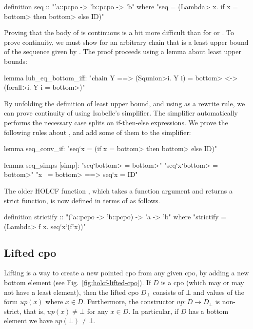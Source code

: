 %
\begin{isacode}
definition seq :: "'a::pcpo -> 'b::pcpo -> 'b"
  where "seq = (\<Lambda> x. if x = \<bottom> then \<bottom> else ID)"
\end{isacode}
%
Proving that the body of  is continuous is a bit more difficult than for  or . To prove continuity, we must show for an arbitrary chain  that  is a least upper bound of the sequence given by . The proof proceeds using a lemma about least upper bounds:
%
\begin{isacode}
lemma lub_eq_bottom_iff: "chain Y ==> (\<Squnion>i. Y i) = \<bottom> <-> (\<forall>i. Y i = \<bottom>)"
\end{isacode}
%
By unfolding the definition of least upper bound, and using  as a rewrite rule, we can prove continuity of  using Isabelle's simplifier. The simplifier automatically performs the necessary case splits on if-then-else expressions. We prove the following rules about , and add some of them to the simplifier:
%
\begin{isacode}
lemma seq_conv_if: "seq`x = (if x = \<bottom> then \<bottom> else ID)"
\end{isacode}
\unmedskip
{}
\begin{isacode}
lemma seq_simps [simp]:
  "seq`\<bottom> = \<bottom>"
  "seq`x`\<bottom> = \<bottom>"
  "x ~= \<bottom> ==> seq`x = ID"
\end{isacode}
%
The older HOLCF function , which takes a function argument and returns a strict function, is now defined in terms of  as follows.
%
\begin{isacode}
definition strictify :: "('a::pcpo -> 'b::pcpo) -> 'a -> 'b"
  where "strictify = (\<Lambda> f x. seq`x`(f`x))"
\end{isacode}
\unmedskip


\subsection{Lifted cpo}
\label{sec:holcf-u}

Lifting is a way to create a new pointed cpo from any given cpo, by adding a new bottom element (see Fig.~\ref{fig:holcf-lifted-cpo}). If $D$ is a cpo (which may or may not have a least element), then the lifted cpo $D_\bot$ consists of $\bot$ and values of the form $\mathit{up}(x)$ where $x\in D$. Furthermore, the constructor $\mathit{up} : D \to D_\bot$ is non-strict, that is, $\mathit{up}(x) \neq \bot$ for any $x \in D$. In particular, if $D$ has a bottom element we have $\mathit{up}(\bot) \neq \bot$.

